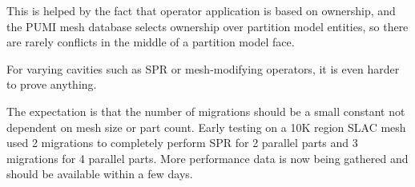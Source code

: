 \documentclass{article}
\begin{document}
This is helped by the fact that operator application
is based on ownership, and the PUMI mesh database
selects ownership over partition model entities,
so there are rarely conflicts in the middle of a
partition model face.

For varying cavities such as SPR or mesh-modifying
operators, it is even harder to prove anything.

The expectation is that the number of migrations should
be a small constant not dependent on mesh size
or part count.
Early testing on a 10K region SLAC mesh used 2 migrations
to completely perform SPR for 2 parallel parts and 3 migrations
for 4 parallel parts.
More performance data is now being gathered and
should be available within a few days.
\end{document}
